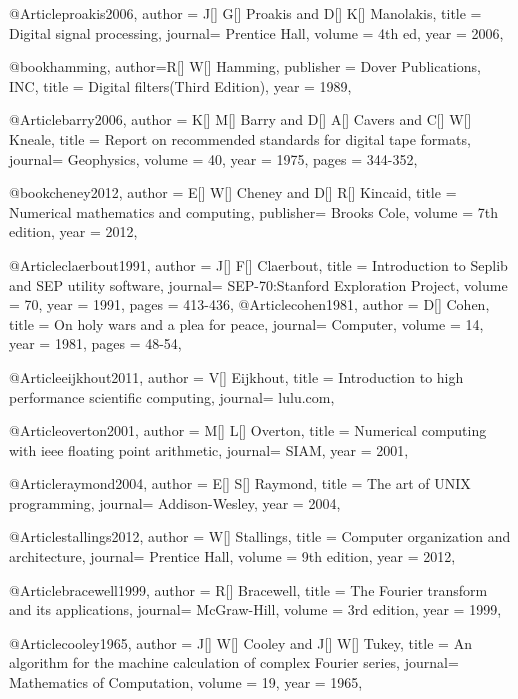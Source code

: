 @Article{proakis2006,
  author = 	 {J[] G[] Proakis and D[] K[] Manolakis},
  title  = 	 {Digital signal processing},
  journal= 	 {Prentice Hall},
  volume =	 {4th ed},
  year   = 	 2006,
}

@book{hamming,
  author={R[] W[] Hamming},
  publisher = {Dover Publications, INC},
  title = {Digital filters(Third Edition)},
  year = {1989},
}

@Article{barry2006,
  author = 	 {K[] M[] Barry and D[] A[] Cavers and C[] W[] Kneale},
  title  = 	 {Report on recommended standards for digital tape formats},
  journal= 	 {Geophysics},
  volume =	 {40},
  year   = 	 1975,
  pages  = 	 344-352,
}

@book{cheney2012,
  author = 	 {E[] W[] Cheney and D[] R[] Kincaid},
  title  = 	 {Numerical mathematics and computing},
  publisher= 	 {Brooks Cole},
  volume =	 {7th edition},
  year   = 	 2012,
}

@Article{claerbout1991,
  author = 	 {J[] F[] Claerbout},
  title  = 	 {Introduction to Seplib and SEP utility software},
  journal= 	 {SEP-70:Stanford Exploration Project},
  volume =	 {70},
  year   = 	 1991,
  pages  =	 413-436,
}
@Article{cohen1981,
  author = 	 {D[] Cohen},
  title  = 	 {On holy wars and a plea for peace},
  journal= 	 {Computer},
  volume =	 {14},
  year   = 	 1981,
  pages  =   	 48-54,
}

@Article{eijkhout2011,
  author = 	 {V[] Eijkhout},
  title  = 	 {Introduction to high performance scientific computing},
  journal= 	 {lulu.com},
}

@Article{overton2001,
  author = 	 {M[] L[] Overton},
  title  = 	 {Numerical computing with ieee floating point arithmetic},
  journal= 	 {SIAM},
  year   = 	 2001,
}

@Article{raymond2004,
  author = 	 {E[] S[] Raymond},
  title  = 	 {The art of UNIX programming},
  journal= 	 {Addison-Wesley},
  year   = 	 2004,
}

@Article{stallings2012,
  author = 	 {W[] Stallings},
  title  = 	 {Computer organization and architecture},
  journal= 	 {Prentice Hall},
  volume =	 {9th edition},
  year   = 	 2012,
}

@Article{bracewell1999,
  author = 	 {R[] Bracewell},
  title  = 	 {The {F}ourier transform and its applications},
  journal= 	 {McGraw-Hill},
  volume =	 {3rd edition},
  year   = 	 1999,
}

@Article{cooley1965,
  author = 	 {J[] W[] Cooley and J[] W[] Tukey},
  title  = 	 {An algorithm for the machine calculation of complex {F}ourier series},
  journal= 	 {Mathematics of Computation},
  volume =	 {19},
  year   = 	 1965,
}

